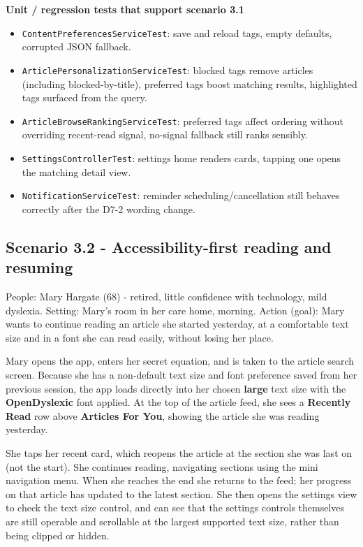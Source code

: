 \documentclass[a4paper, 12pt]{article}
\begin{document}
    \textbf{Unit / regression tests that support scenario 3.1}

    \begin{itemize}
        \item \texttt{ContentPreferencesServiceTest}: save and reload tags,
            empty defaults, corrupted JSON fallback.

        \item \texttt{ArticlePersonalizationServiceTest}: blocked tags remove articles
            (including blocked-by-title), preferred tags boost matching results,
            highlighted tags surfaced from the query.

        \item \texttt{ArticleBrowseRankingServiceTest}: preferred tags affect ordering
            without overriding recent-read signal, no-signal fallback still
            ranks sensibly.

        \item \texttt{SettingsControllerTest}: settings home renders cards,
            tapping one opens the matching detail view.

        \item \texttt{NotificationServiceTest}: reminder scheduling/cancellation
            still behaves correctly after the D7-2 wording change.
    \end{itemize}

    \subsection{Scenario 3.2 - Accessibility-first reading and resuming}

    People: Mary Hargate (68) - retired, little confidence with technology, mild
    dyslexia. Setting: Mary's room in her care home, morning. Action (goal): Mary
    wants to continue reading an article she started yesterday, at a comfortable
    text size and in a font she can read easily, without losing her place.

    Mary opens the app, enters her secret equation, and is taken to the article search
    screen. Because she has a non-default text size and font preference saved
    from her previous session, the app loads directly into her chosen \textbf{large}
    text size with the \textbf{OpenDyslexic} font applied. At the top of the
    article feed, she sees a \textbf{Recently Read} row above \textbf{Articles
    For You}, showing the article she was reading yesterday.

    She taps her recent card, which reopens the article at the section she was last
    on (not the start). She continues reading, navigating sections using the mini
    navigation menu. When she reaches the end she returns to the feed; her progress
    on that article has updated to the latest section. She then opens the
    settings view to check the text size control, and can see that the settings controls
    themselves are still operable and scrollable at the largest supported text size,
    rather than being clipped or hidden.
\end{document}
